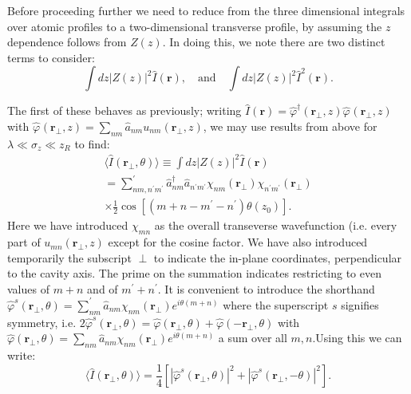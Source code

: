 \documentclass[twocolumn]{revtex4-1}
\renewcommand{\vec}[1]{\mathbf{#1}}
\begin{document}
Before proceeding further we need to reduce from the three dimensional integrals
over atomic profiles to a two-dimensional transverse profile, by assuming
the $z$ dependence follows from $Z(z)$.  In doing this, we note there are
two distinct terms to consider:
\begin{displaymath}
  \int dz |Z(z)|^2 \hat{I}(\vec{r}), \quad\text{and}\quad
  \int dz |Z(z)|^2 \hat{I}^2(\vec{r}).
\end{displaymath}

The first of these behaves as previously; writing $\hat{I}(\vec{r}) =
\hat{\varphi}^\dagger(\vec{r}_\perp,z)\hat{\varphi}^{}(\vec{r}_\perp,z)$
with $\hat{\varphi}^{}(\vec{r}_\perp,z)=\sum_{nm} \hat{a}_{nm}
u_{nm}(\vec{r}_\perp,z)$, we may use results from
above for $\lambda \ll \sigma_z \ll z_R$ to find:
\begin{multline*}
  \langle \hat{I}(\vec{r}_\perp,\theta) \rangle \equiv
  \int dz |Z(z)|^2 \hat{I}(\vec{r})
\\= \sum^\prime_{nm, n^\prime m^\prime}
  \hat{a}^\dagger_{nm}
  \hat{a}^{}_{n^\prime m^\prime}
  \chi_{nm}(\vec{r}_\perp)
  \chi_{n^\prime m^\prime}(\vec{r}_\perp)
  \\\times
  \frac{1}{2} \cos\left[(m+n-m^\prime -n^\prime)\theta(z_0)\right].
\end{multline*}
Here we have introduced $\chi_{mn}$ as the overall transeverse
wavefunction (i.e. every part of $u_{mn}(\vec{r}_\perp,z)$ except for
the cosine factor.  We have also introduced temporarily the subscript
$\perp$ to indicate the in-plane coordinates, perpendicular to the
cavity axis.  The prime on the summation indicates restricting to even
values of $m+n$ and of $m^\prime+n^\prime$.  It is convenient to
introduce the shorthand $\hat{\varphi}^s(\vec{r}_\perp,\theta) =
\sum^\prime_{nm} \hat{a}^{}_{nm} \chi_{nm}(\vec{r}_\perp) e^{i
  \theta(m+n)}$ where the superscript $s$ signifies symmetry,
i.e. $2\hat{\varphi}^s(\vec{r}_\perp,\theta) =
\hat{\varphi}(\vec{r}_\perp,\theta) +
\hat{\varphi}(-\vec{r}_\perp,\theta)$ with
$\hat{\varphi}(\vec{r}_\perp,\theta) = \sum_{nm} \hat{a}^{}_{nm}
\chi_{nm}(\vec{r}_\perp) e^{i \theta(m+n)}$ a sum over all $m,n$.Using
this we can write:
\begin{equation}
  \langle \hat{I}(\vec{r}_\perp,\theta) \rangle 
  = \frac{1}{4}\left[
  |\hat{\varphi}^s(\vec{r}_\perp,\theta)|^2
  +
  |\hat{\varphi}^{s}(\vec{r}_\perp,-\theta)|^2
  \right].
\end{equation}
\end{document}
